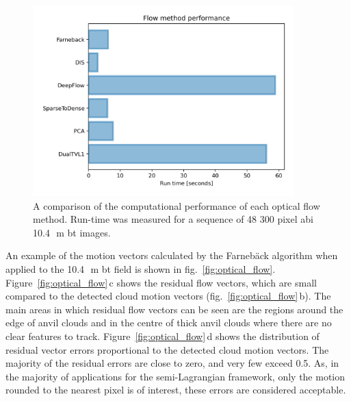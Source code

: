 \begin{figure}[tp]
    \includegraphics[width=0.9\textwidth]{figures/chapter1_13.png}
    \caption[
    A comparison of the computational performance of each optical flow method
    ]{
    A comparison of the computational performance of each optical flow method. Run-time was measured for a sequence of 48 300 pixel \acrshort{abi} 10.4\,\unit{\mu m} \acrshort{bt} images.
    }
    \label{fig:opt_flow_cost}
\end{figure}


An example of the motion vectors calculated by the Farnebäck algorithm when applied to the 10.4\,\unit{\mu m} \acrshort{bt} field is shown in fig.~\ref{fig:optical_flow}.
Figure~\ref{fig:optical_flow}\,c shows the residual flow vectors, which are small compared to the detected cloud motion vectors (fig.~\ref{fig:optical_flow}\,b).
The main areas in which residual flow vectors can be seen are the regions around the edge of anvil clouds and in the centre of thick anvil clouds where there are no clear features to track.
Figure~\ref{fig:optical_flow}\,d shows the distribution of residual vector errors proportional to the detected cloud motion vectors.
The majority of the residual errors are close to zero, and very few exceed 0.5.
As, in the majority of applications for the semi-Lagrangian framework, only the motion rounded to the nearest pixel is of interest, these errors are considered acceptable.


